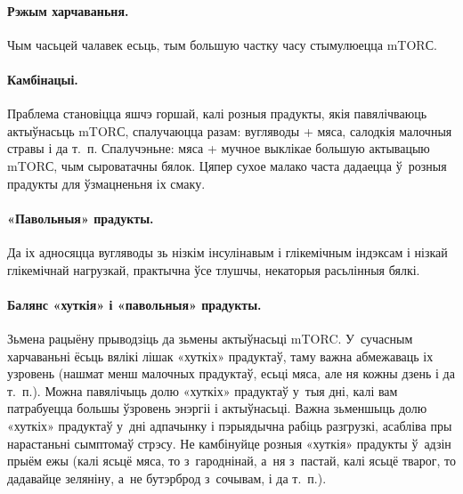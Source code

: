 \paragraph{Рэжым харчаваньня.}
Чым часьцей чалавек есьць, тым большую частку часу стымулюецца mTORС.

\paragraph{Камбінацыі.}
Праблема становіцца яшчэ горшай, калі розныя прадукты, якія павялічваюць актыўнасьць mTORС, спалучаюцца разам: вугляводы + мяса, салодкія малочныя стравы і да т.~п. Спалучэньне: мяса + мучное выклікае большую актывацыю mTORС, чым сыроватачны бялок. Цяпер сухое малако часта дадаецца ў~розныя прадукты для ўзмацненьня іх смаку.

\paragraph{«Павольныя» прадукты.}
Да іх адносяцца вугляводы зь нізкім інсулінавым і глікемічным індэксам і нізкай глікемічнай нагрузкай, практычна ўсе тлушчы, некаторыя расьлінныя бялкі.

\paragraph{Балянс «хуткія» і «павольныя» прадукты.}
Зьмена рацыёну прыводзіць да зьмены актыўнасьці mTORC. У~сучасным харчаваньні ёсьць вялікі лішак «хуткіх» прадуктаў, таму важна абмежаваць іх узровень (нашмат менш малочных прадуктаў, есьці мяса, але ня кожны дзень і да т.~п.). Можна павялічыць долю «хуткіх» прадуктаў у~тыя дні, калі вам патрабуецца большы ўзровень энэргіі і актыўнасьці. Важна зьменшыць долю «хуткіх» прадуктаў у~дні адпачынку і пэрыядычна рабіць разгрузкі, асабліва пры нарастаньні сымптомаў стрэсу. Не камбінуйце розныя «хуткія» прадукты ў~адзін прыём ежы (калі ясьцё мяса, то з~гароднінай, а~ня з~пастай, калі ясьцё тварог, то дадавайце зеляніну, а~не бутэрброд з~сочывам, і да т.~п.).


